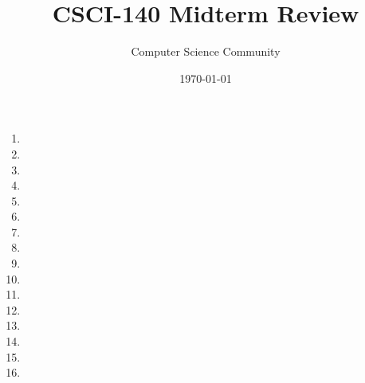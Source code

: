 \documentclass[11pt]{article}
\title{CSCI-140 Midterm Review}
\author{Computer Science Community}
\date{\today}
\begin{document}
\header
\begin{enumerate}

	\item 
	
	\item 
	
	\item 
	
	\item 
	
	\item 

	\item 

	\item 

	\item 

	\item 

	\item 

	\item 
	
	\item 
	
	\item 

	\item 

	\item 

	\item 


\end{enumerate}
\end{document}
